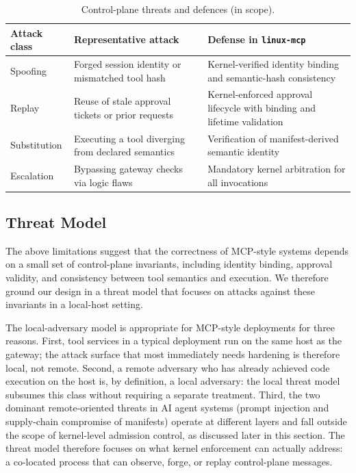 \begin{table}[t]
\centering
\small
\begin{tabular}{l p{4.8cm} p{5.2cm}}
\toprule
\textbf{Attack class} & \textbf{Representative attack} & \textbf{Defense in \texttt{linux-mcp}} \\
\midrule

Spoofing
& Forged session identity or mismatched tool hash
& Kernel-verified identity binding and semantic-hash consistency \\

Replay
& Reuse of stale approval tickets or prior requests
& Kernel-enforced approval lifecycle with binding and lifetime validation \\

Substitution
& Executing a tool diverging from declared semantics
& Verification of manifest-derived semantic identity \\

Escalation
& Bypassing gateway checks via logic flaws
& Mandatory kernel arbitration for all invocations \\

\bottomrule
\end{tabular}
\caption{Control-plane threats and defences (in scope).}
\label{tab:threat_in_scope}
\end{table}


\subsection{Threat Model}

The above limitations suggest that the correctness of MCP-style systems depends on a small set of control-plane invariants, including identity binding, approval validity, and consistency between tool semantics and execution.
We therefore ground our design in a threat model that focuses on attacks against these invariants in a local-host setting.

The local-adversary model is appropriate for MCP-style deployments for three reasons.
First, tool services in a typical deployment run on the same host as the gateway; the attack surface that most immediately needs hardening is therefore local, not remote.
Second, a remote adversary who has already achieved code execution on the host is, by definition, a local adversary: the local threat model subsumes this class without requiring a separate treatment.
Third, the two dominant remote-oriented threats in AI agent systems (prompt injection and supply-chain compromise of manifests) operate at different layers and fall outside the scope of kernel-level admission control, as discussed later in this section.
The threat model therefore focuses on what kernel enforcement can actually address: a co-located process that can observe, forge, or replay control-plane messages.


